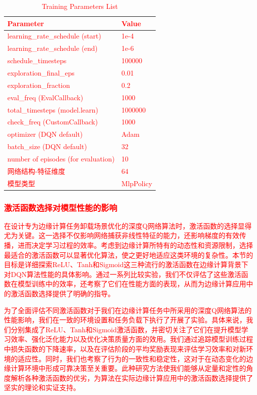 \documentclass[preprint,12pt]{elsarticle}
\begin{document}
\textcolor{red}{
\begin{table}[hbt]
    \begin{tabularx}{\textwidth} {m{}<{\raggedright}m{}<{\raggedright}}
    \hline
    \textbf{Parameter} & \textbf{Value} \\
    \hline
    learning\_rate\_schedule (start) & 1e-4\\
    learning\_rate\_schedule (end) & 1e-6\\
    schedule\_timesteps & 100000\\
    exploration\_final\_eps & 0.01\\
    exploration\_fraction & 0.2\\
    eval\_freq (EvalCallback) & 1000\\
    total\_timesteps (model.learn) & 1000000\\
    check\_freq (CustomCallback) & 1000\\
    optimizer (DQN default) & Adam\\
    batch\_size (DQN default) & 32\\
    number of episodes (for evaluation) & 10\\
    网络结构-特征维度 & 64 \\
    模型类型 & MlpPolicy\\
    \hline
    \end{tabularx}
    \caption{Training Parameters List}
\end{table}}


\textcolor{red}{\subsubsection{激活函数选择对模型性能的影响}}

\textcolor{red}{在设计专为边缘计算任务卸载场景优化的深度Q网络算法时，激活函数的选择显得尤为关键。这一选择不仅影响网络捕获非线性特征的能力，还影响梯度的有效传播，进而决定学习过程的效率。考虑到边缘计算所特有的动态性和资源限制，选择最适合的激活函数可以显著优化算法，使之更好地适应这类环境的复杂性。本节的目标是详细探索ReLU、Tanh和Sigmoid这三种流行的激活函数在边缘计算背景下对DQN算法性能的具体影响。通过一系列比较实验，我们不仅评估了这些激活函数在模型训练中的效率，还考察了它们在性能方面的表现，从而为边缘计算应用中的激活函数选择提供了明确的指导。}

\textcolor{red}{为了全面评估不同激活函数对于我们在边缘计算任务中所采用的深度Q网络算法的性能影响，我们在一致的环境设置和任务负载下执行了开展了实验。具体来说，我们分别集成了ReLU、Tanh和Sigmoid激活函数，并密切关注了它们在提升模型学习效率、强化泛化能力以及优化决策质量方面的效用。我们通过追踪模型训练过程中损失函数的下降速率，以及在评估阶段的平均奖励表现来评估学习效率和对新环境的适应性。同时，我们也考察了行为的一致性和稳定性，这对于在动态变化的边缘计算环境中形成可靠决策至关重要。此种研究方法使我们能够从定量和定性的角度解析各种激活函数的优劣，为算法在实际边缘计算应用中的激活函数选择提供了坚实的理论和实证支持。}
\end{document}
